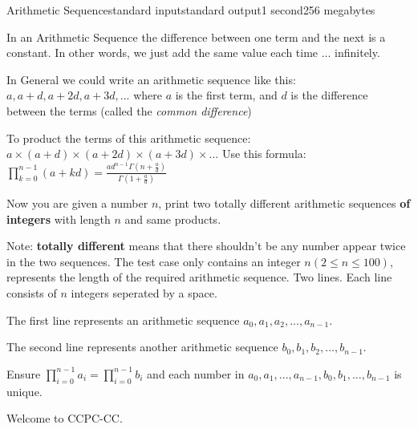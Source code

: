 \begin{problem}{Arithmetic Sequence}{standard input}{standard output}{1 second}{256 megabytes}

    In an Arithmetic Sequence the difference between one term and the next is a constant. In other words, we just add the same value each time ... infinitely.

    In General we could write an arithmetic sequence like this: ${a, a+d, a+2d, a+3d, ... }$ where $a$ is the first term, and $d$ is the difference between the terms (called the \textsl{common difference})
    
    To product the terms of this arithmetic sequence: ${a \times (a+d) \times (a+2d) \times (a+3d) \times ...}$ Use this formula: $\prod_{k=0}^{n-1}(a+kd)=\frac{ad^{n-1}\Gamma(n+\frac{a}{d})}{\Gamma(1+\frac{a}{d})}$
    
    Now you are given a number $n$, print two totally different arithmetic sequences \textbf{of integers} with length $n$ and same products.
    
    Note: \textbf{totally different} means that there shouldn't be any number appear twice in the two sequences.
\InputFile
The test case only contains an integer $n(2\le n \le 100)$, represents the length of the required arithmetic sequence.
\OutputFile
Two lines. Each line consists of $n$ integers seperated by a space.

The first line represents an arithmetic 
sequence $a_0, a_1, a_2, ..., a_{n-1}$.

The second line represents another arithmetic sequence $b_0, b_1, b_2, ..., b_{n-1}$.

Ensure $\prod_{i=0}^{n-1}a_i=\prod_{i=0}^{n-1}b_i$ and each number in $a_0, a_1, ..., a_{n-1}, b_0, b_1, ..., b_{n-1}$ is unique.

\Example

\begin{example}
%
%
\end{example}

\Notes

Welcome to CCPC-CC.

\end{problem}

